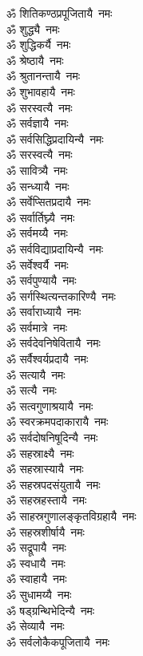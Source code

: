 \begin{flushleft}
\begin{multicols}{2}
ॐ शितिकण्ठप्रपूजितायै~नमः\\
ॐ शुद्ध्यै~नमः\\
ॐ शुद्धिकर्यै~नमः\hfill{}\\
ॐ श्रेष्ठायै~नमः\\
ॐ श्रुतानन्तायै~नमः\\
ॐ शुभावहायै~नमः\\
ॐ सरस्वत्यै~नमः\\
ॐ सर्वज्ञायै~नमः\\
ॐ सर्वसिद्धिप्रदायिन्यै~नमः\\
ॐ सरस्वत्यै~नमः\\
ॐ सावित्र्यै~नमः\\
ॐ सन्ध्यायै~नमः\\
ॐ सर्वेप्सितप्रदायै~नमः\hfill{}\\
ॐ सर्वार्तिघ्न्यै~नमः\\
ॐ सर्वमय्यै~नमः\\
ॐ सर्वविद्याप्रदायिन्यै~नमः\\
ॐ सर्वेश्वर्यै~नमः\\
ॐ सर्वपुण्यायै~नमः\\
ॐ सर्गस्थित्यन्तकारिण्यै~नमः\\
ॐ सर्वाराध्यायै~नमः\\
ॐ सर्वमात्रे~नमः\\
ॐ सर्वदेवनिषेवितायै~नमः\\
ॐ सर्वैश्वर्यप्रदायै~नमः\hfill{}\\
ॐ सत्यायै~नमः\\
ॐ सत्यै~नमः\\
ॐ सत्वगुणाश्रयायै~नमः\\
ॐ स्वरक्रमपदाकारायै~नमः\\
ॐ सर्वदोषनिषूदिन्यै~नमः\\
ॐ सहस्राक्ष्यै~नमः\\
ॐ सहस्रास्यायै~नमः\\
ॐ सहस्रपदसंयुतायै~नमः\\
ॐ सहस्रहस्तायै~नमः\\
ॐ साहस्रगुणालङ्कृतविग्रहायै~नमः\hfill{}\\
ॐ सहस्रशीर्षायै~नमः\\
ॐ सद्रूपायै~नमः\\
ॐ स्वधायै~नमः\\
ॐ स्वाहायै~नमः\\
ॐ सुधामय्यै~नमः\\
ॐ षड्ग्रन्थिभेदिन्यै~नमः\\
ॐ सेव्यायै~नमः\\
ॐ सर्वलोकैकपूजितायै~नमः\\

\end{multicols}
\end{flushleft}
